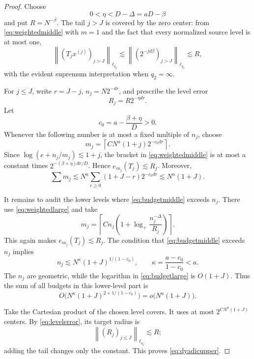 \documentclass[11pt]{article}
\begin{document}
\begin{proof}
Choose
\begin{equation}\label{eq:eta}
 0<\eta<D-\Delta=aD-\beta
\end{equation}
and put $R=N^{-\beta}$.  The tail $j>J$ is covered by the zero center:
from \eqref{eq:weightedmiddle} with $m=1$ and the fact that every normalized
source level is at most one,
\[
 \left\|(T_jx^{(j)})_{j>J}\right\|_{\ell_{q_2}}
 \lesssim
 \left\|(2^{-jd\beta})_{j>J}\right\|_{\ell_{q_2}}
 \lesssim R,
\]
with the evident supremum interpretation when $q_2=\infty$.

For $j\le J$, write $r=J-j$, $n_j=N2^{-dr}$, and prescribe the level error
\begin{equation}\label{eq:levelerror}
 R_j=R2^{-\eta dr}.
\end{equation}
Let
\[
 c_0=a-\frac{\beta+\eta}{D}>0.
\]
Whenever the following number is at most a fixed multiple of $n_j$, choose
\begin{equation}\label{eq:budgetmiddle}
 m_j=\left\lceil
 C N^a(1+j)2^{-c_0dr}
 \right\rceil.
\end{equation}
Since $\log(e+n_j/m_j)\lesssim1+j$, the bracket in
\eqref{eq:weightedmiddle} is at most a constant times
$2^{-(\beta+\eta)dr/D}$.  Hence $e_{m_j}(T_j)\lesssim R_j$.
Moreover,
\begin{equation}\label{eq:middlebudget}
 \sum m_j\lesssim
 N^a\sum_{r\ge0}(1+J-r)2^{-c_0dr}
 \lesssim N^a(1+J).
\end{equation}

It remains to audit the lower levels where \eqref{eq:budgetmiddle} exceeds
$n_j$.  There use \eqref{eq:weightedlarge} and take
\begin{equation}\label{eq:budgetlarge}
 m_j=\left\lceil Cn_j
 \left(1+\log_+\frac{n_j^{-\Delta}}{R_j}\right)\right\rceil.
\end{equation}
This again makes $e_{m_j}(T_j)\lesssim R_j$.  The condition that
\eqref{eq:budgetmiddle} exceeds $n_j$ implies
\[
 n_j\lesssim
 N^\kappa(1+J)^{1/(1-c_0)},
 \qquad
 \kappa=\frac{a-c_0}{1-c_0}<a.
\]
The $n_j$ are geometric, while the logarithm in
\eqref{eq:budgetlarge} is $O(1+J)$.  Thus the sum of all budgets in this
lower-level part is
\[
 O\big(N^\kappa(1+J)^{2+1/(1-c_0)}\big)
 =o\big(N^a(1+J)\big).
\]

Take the Cartesian product of the chosen level covers.  It uses at most
$2^{C N^a(1+J)}$ centers.  By \eqref{eq:levelerror}, its target radius is
\[
 \left\|(R_j)_{j\le J}\right\|_{\ell_{q_2}}
 \lesssim R;
\]
adding the tail changes only the constant.  This proves
\eqref{eq:dyadicupper}.
\end{proof}
\end{document}
